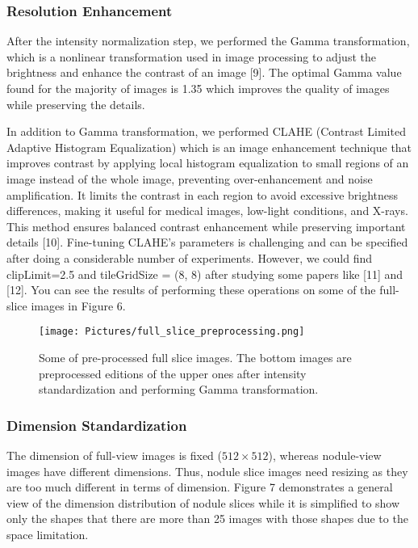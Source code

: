 \documentclass[a4paper, twocolumn, 11pt]{article}
\begin{document}
\subsubsection{Resolution Enhancement} 
After the intensity normalization step, we performed the Gamma transformation, which is a nonlinear transformation used in image processing to adjust the brightness and enhance the contrast of an image [9]. The optimal Gamma value found for the majority of images is 1.35 which improves the quality of images while preserving the details. \par
In addition to Gamma transformation, we performed CLAHE (Contrast Limited Adaptive Histogram Equalization) which is an image enhancement technique that improves contrast by applying local histogram equalization to small regions of an image instead of the whole image, preventing over-enhancement and noise amplification. It limits the contrast in each region to avoid excessive brightness differences, making it useful for medical images, low-light conditions, and X-rays. This method ensures balanced contrast enhancement while preserving important details [10]. Fine-tuning CLAHE's parameters is challenging and can be specified after doing a considerable number of experiments. However, we could find clipLimit=2.5 and tileGridSize = (8, 8) after studying some papers like [11] and [12]. You can see the results of performing these operations on some of the full-slice images in Figure 6. \par

\begin{figure}[h!]
    \centering
    \texttt{[image: Pictures/full\_slice\_preprocessing.png]}
    \caption{Some of pre-processed full slice images. The bottom images are preprocessed editions of the upper ones after intensity standardization and performing Gamma transformation.}
    \label{fig:Figure 6}
\end{figure}

\subsubsection{Dimension Standardization} 
The dimension of full-view images is fixed ($512 \times 512$), whereas nodule-view images have different dimensions. Thus, nodule slice images need resizing as they are too much different in terms of dimension. Figure 7 demonstrates a general view of the dimension distribution of nodule slices while it is simplified to show only the shapes that there are more than 25 images with those shapes due to the space limitation. 
\end{document}
